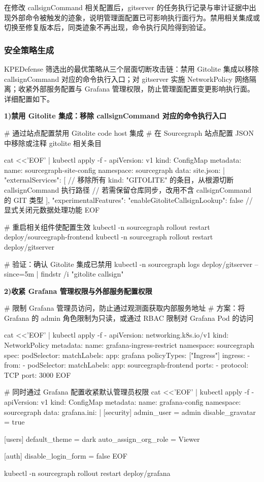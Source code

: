 在修改 callsignCommand 相关配置后，gitserver 的任务执行记录与审计证据中出现外部命令被触发的迹象，说明管理面配置已可影响执行面行为。禁用相关集成或切换至修复版本后，同类迹象不再出现，命令执行风险得到验证。

\subsubsection{安全策略生成}

KPEDefense 筛选出的最优策略从三个层面切断攻击链：禁用 Gitolite 集成以移除 callsignCommand 对应的命令执行入口；对 gitserver 实施 NetworkPolicy 网络隔离；收紧外部服务配置与 Grafana 管理权限，防止管理面配置变更影响执行面。详细配置如下。

\textbf{1)禁用 Gitolite 集成：移除 callsignCommand 对应的命令执行入口}
\begin{AppendixCode}
# 通过站点配置禁用 Gitolite code host 集成
# 在 Sourcegraph 站点配置 JSON 中移除或注释 gitolite 相关条目

cat <<'EOF' | kubectl apply -f -
apiVersion: v1
kind: ConfigMap
metadata:
  name: sourcegraph-site-config
  namespace: sourcegraph
data:
  site.json: |
    {
      "externalServices": [
        // 移除所有 kind: "GITOLITE" 的条目，从根源切断 callsignCommand 执行路径
        // 若需保留仓库同步，改用不含 callsignCommand 的 GIT 类型
      ],
      "experimentalFeatures": {
        "enableGitoliteCallsignLookup": false  // 显式关闭元数据处理功能
      }
    }
EOF

# 重启相关组件使配置生效
kubectl -n sourcegraph rollout restart deploy/sourcegraph-frontend
kubectl -n sourcegraph rollout restart deploy/gitserver

# 验证：确认 Gitolite 集成已禁用
kubectl -n sourcegraph logs deploy/gitserver --since=5m | findstr /i "gitolite callsign"
\end{AppendixCode}

\textbf{2)收紧 Grafana 管理权限与外部服务配置权限}
\begin{AppendixCode}
# 限制 Grafana 管理员访问，防止通过观测面获取内部服务地址
# 方案：将 Grafana 的 admin 角色限制为只读，或通过 RBAC 限制对 Grafana Pod 的访问

cat <<'EOF' | kubectl apply -f -
apiVersion: networking.k8s.io/v1
kind: NetworkPolicy
metadata:
  name: grafana-ingress-restrict
  namespace: sourcegraph
spec:
  podSelector:
    matchLabels:
      app: grafana
  policyTypes: ["Ingress"]
  ingress:
  - from:
    - podSelector:
        matchLabels:
          app: sourcegraph-frontend
    ports:
    - protocol: TCP
      port: 3000
EOF

# 同时通过 Grafana 配置收紧默认管理员权限
cat <<'EOF' | kubectl apply -f -
apiVersion: v1
kind: ConfigMap
metadata:
  name: grafana-config
  namespace: sourcegraph
data:
  grafana.ini: |
    [security]
    admin_user = admin
    disable_gravatar = true

    [users]
    default_theme = dark
    auto_assign_org_role = Viewer

    [auth]
    disable_login_form = false
EOF

kubectl -n sourcegraph rollout restart deploy/grafana
\end{AppendixCode}

